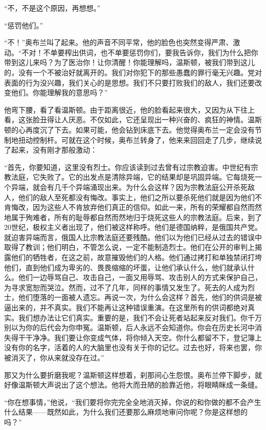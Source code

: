 ``不，不是这个原因，再想想。''

``惩罚他们。''

``不！''奥布兰叫了起来。他的声音不同平常，他的脸色也突然变得严肃、激动。``不对！不单要榨出供词，也不单要惩罚你们，要我告诉你，我们为什么把你带到这儿来吗？为了医治你！让你清醒！你能理解吗，温斯顿，被我们带到这儿的，没有一个不被治好就离开的。我们对你犯下的那些愚蠢的罪行毫无兴趣。党对表面的行为没兴趣，我们关心的是思想。我们不只要打败我们的敌人，我们还要改变他们。你能理解我的意思吗？''

他弯下腰，看了看温斯顿。由于距离很近，他的脸看起来很大，又因为从下往上看，这张脸丑得让人厌恶。不仅如此，它还呈现出一种兴奋的、疯狂的神情。温斯顿的心再度沉了下去。如果可能，他会钻到床底下去。他觉得奥布兰一定会没有节制地扭动控制杆。可就在这个时候，奥布兰转身了，他来来回回走了几步，继续说了起来，没有刚才那般激动：

``首先，你要知道，这里没有烈士。你应该读到过去曾有过宗教迫害。中世纪有宗教法庭，它失败了。它的出发点是清除异端，它的结果却是巩固异端。它每烧死一个异端，就会有几千个异端涌现出来。为什么会这样？因为宗教法庭公开杀死敌人，他们的敌人至死都没有悔改。事实上，他们之所以要杀死他们就是因为他们不肯悔改，因为这些人不肯放弃他们真正的信仰。如此一来，所有的荣耀都自然而然地属于殉难者，所有的耻辱都自然而然地归于烧死这些人的宗教法庭。后来，到了20世纪，极权主义者出现了，他们被这样称呼。他们是德国纳粹，是俄国共产党。就迫害异端而言，俄国人比宗教法庭还要残酷。他们以为他们已经从过去的错误中取得了教训；他们明白，不管怎么说，一定不能制造烈士。他们在公开的审判上揭露他们的牺牲者，在这之前，故意摧毁他们的人格。他们通过拷打和单独禁闭打垮他们，直到他们成为卑劣的、畏畏缩缩的坏蛋，让他们承认什么，他们就承认什么。他们一边辱骂自己、攻击自己，一面又用辱骂、攻击别人的方式来保护自己，为寻求宽恕而哭泣。然而，过不了几年，同样的事情又发生了。死去的人成为烈士，他们堕落的一面被人遗忘。再说一次，为什么会这样？首先，他们的供词是被逼出来的，并不真实。我们不能再让这种错误重演。在这里所有的供词都绝对真实。我们想办法让它们真实。重要的是，我们不会让死者站起来反对我们。你千万别以为你的后代会为你申冤。温斯顿，后人永远不会知道你。你会在历史长河中消失得干干净净。我们要让你变成气体，将你倾入天空。你什么都留不下，登记簿上没有你的名字，活着的人的大脑里也没有关于你的记忆。过去也好，将来也罢，你被消灭了，你从来就没存在过。''

那又为什么要折磨我呢？温斯顿这样想着，刹那间心生怨恨。奥布兰停下脚步，就好像温斯顿大声说出了这个想法。他将大而丑陋的脸靠近他，将眼睛眯成一条缝。

``你在想事情，''他说，``我们要将你完完全全地消灭掉，你说的和你做的都不会产生什么结果------既然如此，为什么我们还要那么麻烦地审问你呢？你是这样想的吗？''

